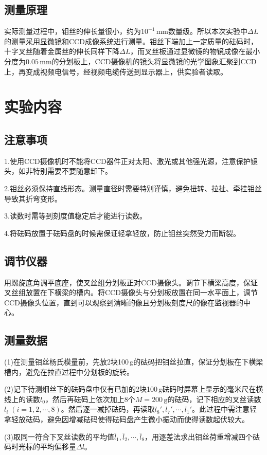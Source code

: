 \documentclass[UTF-8,twoside,cs4size]{ctexart}
\begin{document}
	\subsection{测量原理}
	实际测量过程中，钼丝的伸长量很小，约为$ 10^{-1}\,\mathrm{mm} $数量级。所以本次实验中$ \Delta L $的测量采用显微镜和CCD成像系统进行测量。钼丝下端加上一定质量的砝码时，十字叉丝随着金属丝的伸长同样下降$ \Delta L $，而叉丝板通过显微镜的物镜成像在最小分度为$ 0.05\,\mathrm{mm} $的分划板上，CCD摄像机的镜头将显微镜的光学图象汇聚到CCD上，再变成视频电信号，经视频电缆传送到显示器上，供实验者读取。
	
	\section{实验内容}
	\subsection{注意事项}
	1.使用CCD摄像机时不能将CCD器件正对太阳、激光或其他强光源，注意保护镜头，如非特别需要不要随意卸下。
	
	2.钼丝必须保持直线形态。测量直径时需要特别谨慎，避免扭转、拉扯、牵挂钼丝导致其折弯变形。
	
	3.读数时需等到刻度值稳定后才能进行读数。
	
	4.将砝码放置于砝码盘的时候需保证轻拿轻放，防止钼丝突然受力而断裂。
	\subsection{调节仪器}
	用螺旋底角调平底座，使叉丝组分划板正对CCD摄像头。调节下横梁高度，保证叉丝组放置在下横梁的槽内。将CCD摄像头与分划板放置在同一水平面上，调节CCD摄像头位置，直到可以观察到清晰的像且分划板刻度尺的像在监视器的中心。
	\subsection{测量数据}
	(1)在测量钼丝杨氏模量前，先放2块100\,g的砝码把钼丝拉直，保证分划板在下横梁槽内，避免在拉直过程中分划板的旋转。
	
	(2)记下待测细丝下的砝码盘中仅有已加的2块100\,g砝码时屏幕上显示的毫米尺在横线上的读数$ l_0 $，然后再砝码上依次加上8个$ M=200\,\mathrm{g} $的砝码，记下相应的叉丝读数$ l_i\;(i=1,2,\cdots,8) $。然后逐一减掉砝码，再读取$ l_8',l_7',\cdots,l_1' $。此过程中需注意轻拿轻放砝码，避免因增减砝码使得砝码盘产生微小振动而使得读数起伏较大。
	
	(3)取同一符合下叉丝读数的平均值$ \bar l_1,\bar l_2,\cdots,\bar l_8 $，用逐差法求出钼丝荷重增减四个砝码时光标的平均偏移量$ \Delta l $。
	
\end{document}
